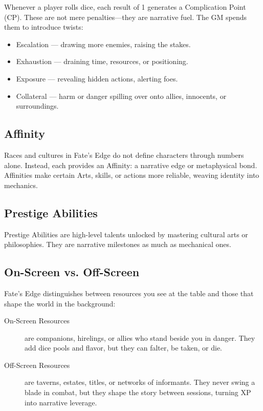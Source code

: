 Whenever a player rolls dice, each result of 1 generates a Complication Point (CP). These are not mere penalties---they are narrative fuel. The GM spends them to introduce twists:

\begin{itemize}
\item Escalation --- drawing more enemies, raising the stakes.
\item Exhaustion --- draining time, resources, or positioning.
\item Exposure --- revealing hidden actions, alerting foes.
\item Collateral --- harm or danger spilling over onto allies, innocents, or surroundings.
\end{itemize}

\subsection{Affinity}

Races and cultures in Fate's Edge do not define characters through numbers alone. Instead, each provides an Affinity: a narrative edge or metaphysical bond. Affinities make certain Arts, skills, or actions more reliable, weaving identity into mechanics.

\subsection{Prestige Abilities}

Prestige Abilities are high-level talents unlocked by mastering cultural arts or philosophies. They are narrative milestones as much as mechanical ones.

\subsection{On-Screen vs. Off-Screen}

Fate's Edge distinguishes between resources you see at the table and those that shape the world in the background:

\begin{description}
\item[On-Screen Resources] are companions, hirelings, or allies who stand beside you in danger. They add dice pools and flavor, but they can falter, be taken, or die.
\item[Off-Screen Resources] are taverns, estates, titles, or networks of informants. They never swing a blade in combat, but they shape the story between sessions, turning XP into narrative leverage.
\end{description}

